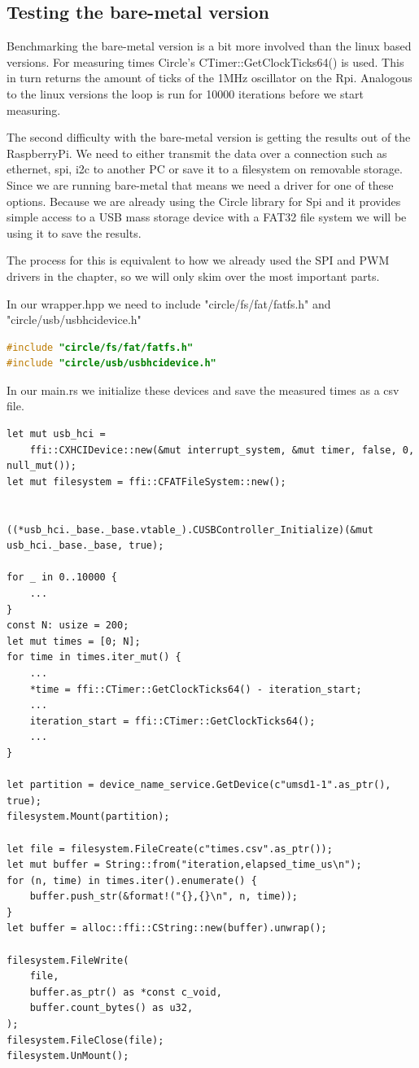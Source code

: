\subsection{Testing the bare-metal version}
Benchmarking the bare-metal version is a bit more involved than the linux based versions.
For measuring times Circle's CTimer::GetClockTicks64() is used. This in turn returns the amount of ticks of the 1MHz oscillator on the Rpi.
Analogous to the linux versions the loop is run for 10000 iterations before we start measuring.

The second difficulty with the bare-metal version is getting the results out of the RaspberryPi.
We need to either transmit the data over a connection such as ethernet, spi, i2c to another PC or save it to a filesystem on removable storage.
Since we are running bare-metal that means we need a driver for one of these options.
Because we are already using the Circle library for Spi and it provides simple access to a USB mass storage device with a FAT32 file system we will be using it to save the results.

The process for this is equivalent to how we already used the SPI and PWM drivers in the  chapter,
so we will only skim over the most important parts.

In our wrapper.hpp we need to include "circle/fs/fat/fatfs.h" and "circle/usb/usbhcidevice.h"
\begin{lstlisting}[language=C++]
#include "circle/fs/fat/fatfs.h"
#include "circle/usb/usbhcidevice.h"
\end{lstlisting}

In our main.rs we initialize these devices and save the measured times as a csv file.
\begin{lstlisting}
let mut usb_hci =
    ffi::CXHCIDevice::new(&mut interrupt_system, &mut timer, false, 0, null_mut());
let mut filesystem = ffi::CFATFileSystem::new();


((*usb_hci._base._base.vtable_).CUSBController_Initialize)(&mut usb_hci._base._base, true);

for _ in 0..10000 {
    ...
}
const N: usize = 200;
let mut times = [0; N];
for time in times.iter_mut() {
    ...
    *time = ffi::CTimer::GetClockTicks64() - iteration_start;
    ...
    iteration_start = ffi::CTimer::GetClockTicks64();
    ...
}

let partition = device_name_service.GetDevice(c"umsd1-1".as_ptr(), true);
filesystem.Mount(partition);

let file = filesystem.FileCreate(c"times.csv".as_ptr());
let mut buffer = String::from("iteration,elapsed_time_us\n");
for (n, time) in times.iter().enumerate() {
    buffer.push_str(&format!("{},{}\n", n, time));
}
let buffer = alloc::ffi::CString::new(buffer).unwrap();

filesystem.FileWrite(
    file,
    buffer.as_ptr() as *const c_void,
    buffer.count_bytes() as u32,
);
filesystem.FileClose(file);
filesystem.UnMount();
\end{lstlisting}

